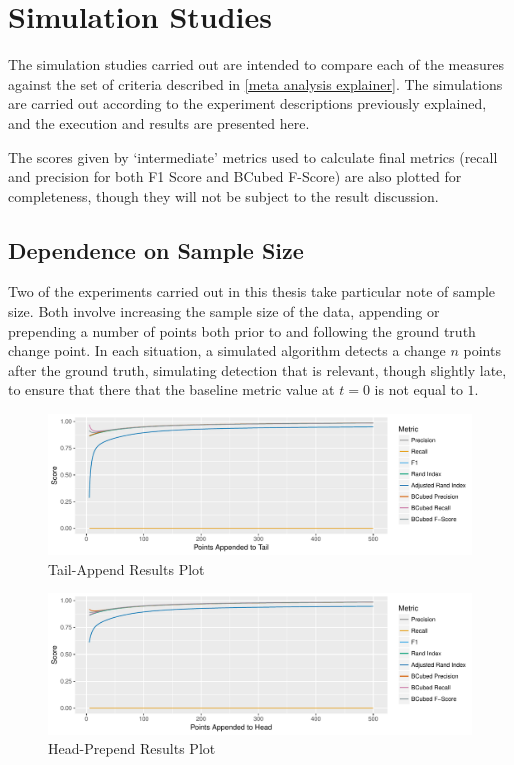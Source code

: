 \documentclass[../main.tex]{subfiles}
\begin{document}
\section{Simulation Studies}

The simulation studies carried out are intended to compare each of the measures against the set of criteria described in \autoref{meta analysis explainer}. The simulations are carried out according to the experiment descriptions previously explained, and the execution and results are presented here.

The scores given by `intermediate' metrics used to calculate final metrics (recall and precision for both F1 Score and BCubed F-Score) are also plotted for completeness, though they will not be subject to the result discussion.

\subsection{Dependence on Sample Size}
\label{sample size dependence}

Two of the experiments carried out in this thesis take particular note of sample size. Both involve increasing the sample size of the data, appending or prepending a number of points both prior to and following the ground truth change point. In each situation, a simulated algorithm detects a change $n$ points after the ground truth, simulating detection that is relevant, though slightly late, to ensure that there that the baseline metric value at $t = 0$ is not equal to $1$.

\begin{figure}[h]
    \includegraphics[width=\textwidth]{figures/Experiment1}
    \caption{Tail-Append Results Plot}
    \label{fig:Experiment1}
\end{figure}

\begin{figure}[h]
    \includegraphics[width=\textwidth]{figures/Experiment4}
    \caption{Head-Prepend Results Plot}
    \label{fig:Experiment2}
\end{figure}
\end{document}
